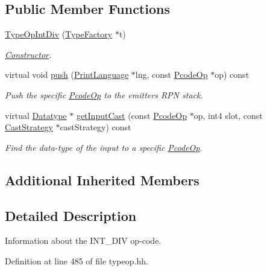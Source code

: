 \subsection*{Public Member Functions}
\begin{DoxyCompactItemize}
\item 
\mbox{\hyperlink{class_type_op_int_div_ad8e8b6a054296860732763e07e30e43f}{Type\+Op\+Int\+Div}} (\mbox{\hyperlink{class_type_factory}{Type\+Factory}} $\ast$t)
\begin{DoxyCompactList}\small\item\em \mbox{\hyperlink{class_constructor}{Constructor}}. \end{DoxyCompactList}\item 
virtual void \mbox{\hyperlink{class_type_op_int_div_a8fee65ef2ac0fcc8373355a597459fcb}{push}} (\mbox{\hyperlink{class_print_language}{Print\+Language}} $\ast$lng, const \mbox{\hyperlink{class_pcode_op}{Pcode\+Op}} $\ast$op) const
\begin{DoxyCompactList}\small\item\em Push the specific \mbox{\hyperlink{class_pcode_op}{Pcode\+Op}} to the emitter\textquotesingle{}s R\+PN stack. \end{DoxyCompactList}\item 
virtual \mbox{\hyperlink{class_datatype}{Datatype}} $\ast$ \mbox{\hyperlink{class_type_op_int_div_ad99f05d40d200997ae62febf063b8ce2}{get\+Input\+Cast}} (const \mbox{\hyperlink{class_pcode_op}{Pcode\+Op}} $\ast$op, int4 slot, const \mbox{\hyperlink{class_cast_strategy}{Cast\+Strategy}} $\ast$cast\+Strategy) const
\begin{DoxyCompactList}\small\item\em Find the data-\/type of the input to a specific \mbox{\hyperlink{class_pcode_op}{Pcode\+Op}}. \end{DoxyCompactList}\end{DoxyCompactItemize}
\subsection*{Additional Inherited Members}


\subsection{Detailed Description}
Information about the I\+N\+T\+\_\+\+D\+IV op-\/code. 

Definition at line 485 of file typeop.\+hh.



